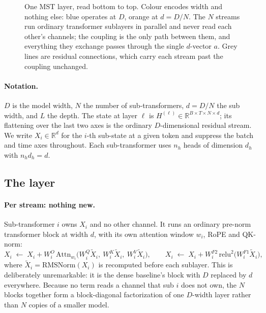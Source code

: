 \documentclass{article}
\newcommand{\dmodel}{D}
\newcommand{\dsub}{d}
\newcommand{\nsub}{N}
\begin{document}
\begin{figure}[t]
\begin{center}
\resizebox{\textwidth}{!}{}
\end{center}
\caption{One MST layer, read bottom to top. Colour encodes width and nothing
else: blue operates at $\dmodel$, orange at $\dsub=\dmodel/\nsub$. The $\nsub$
streams run ordinary transformer sublayers in parallel and never read each
other's channels; the coupling is the only path between them, and everything
they exchange passes through the single $\dsub$-vector $a$. Grey lines are
residual connections, which carry each stream past the coupling unchanged.}
\label{fig:arch}
\end{figure}

\paragraph{Notation.} $\dmodel$ is the model width, $\nsub$ the number of
sub-transformers, $\dsub=\dmodel/\nsub$ the sub width, and $L$ the depth. The
state at layer $\ell$ is $H^{(\ell)}\in\mathbb{R}^{B\times T\times \nsub\times \dsub}$;
its flattening over the last two axes is the ordinary $\dmodel$-dimensional
residual stream. We write $X_i \in \mathbb{R}^{\dsub}$ for the $i$-th sub-state at
a given token and suppress the batch and time axes throughout. Each
sub-transformer uses $n_h$ heads of dimension $d_h$ with $n_h d_h = \dsub$.

\subsection{The layer}

\paragraph{Per stream: nothing new.} Sub-transformer $i$ owns $X_i$ and no other
channel. It runs an ordinary pre-norm transformer block at width $\dsub$, with its
own attention window $w_i$, RoPE \citep{su2021roformer} and QK-norm:
%
\begin{equation}
X_i \;\leftarrow\; X_i + W^{O}_i\,\mathrm{Attn}_{w_i}\!\big(W^{Q}_i\tilde{X}_i,\ W^{K}_i\tilde{X}_i,\ W^{V}_i\tilde{X}_i\big),
\qquad
X_i \;\leftarrow\; X_i + W^{F2}_i\,\mathrm{relu}^2\!\big(W^{F1}_i\tilde{X}_i\big),
\end{equation}
%
where $\tilde{X}_i = \mathrm{RMSNorm}(X_i)$ is recomputed before each sublayer.
This is deliberately unremarkable: it is the dense baseline's block with $\dmodel$
replaced by $\dsub$ everywhere. Because no term reads a channel that sub $i$ does
not own, the $\nsub$ blocks together form a block-diagonal factorization of one
$\dmodel$-width layer rather than $\nsub$ copies of a smaller model.
\end{document}
